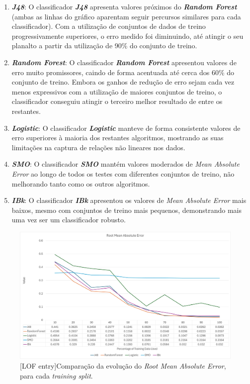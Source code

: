 \documentclass{easychair}
\begin{document}
\begin{enumerate}
	\item \textbf{\textit{J48}}: O classificador \textit{\textbf{J48}} apresenta valores próximos do \textbf{\textit{Random Forest}} (ambas as linhas do gráfico aparentam seguir percursos similares para cada classificador). Com a utilização de conjuntos de dados de treino progressivamente superiores, o erro medido foi diminuindo, até atingir o seu planalto a partir da utilização de 90\% do conjunto de treino.
	\item \textbf{\textit{Random Forest}}: O classificador \textit{\textbf{Random Forest}} apresentou valores de erro muito promissores, caindo de forma acentuada até cerca dos 60\% do conjunto de treino. Embora os ganhos de redução de erro sejam cada vez menos expressivos com a utilização de maiores conjuntos de treino, o classificador conseguiu atingir o terceiro melhor resultado de entre os restantes.
	\item \textbf{\textit{Logistic}}: O classificador \textit{\textbf{Logistic}} manteve de forma consistente valores de erro superiores à maioria dos restantes algoritmos, mostrando as suas limitações na captura de relações não lineares nos dados.
	\item \textbf{\textit{SMO}}: O classificador \textbf{\textit{SMO}} mantém valores moderados de \textit{Mean Absolute Error} ao longo de todos os testes com diferentes conjuntos de treino, não melhorando tanto como os outros algoritmos.
	\item \textbf{\textit{IBk}}: O classificador \textit{\textbf{IBk}} apresentou os valores de \textit{Mean Absolute Error} mais baixos, mesmo com conjuntos de treino mais pequenos, demonstrando mais uma vez ser um classificador robusto.
\end{enumerate}


\begin{figure}[H]
    \begin{centering}
    \includegraphics[width=1\linewidth]{imagens/figure35.jpg}\label{cap-5-fig35}
    [LOF entry]{Comparação da evolução do \textit{Root Mean Absolute Error}, para cada \textit{training split}.}
    \label{fig35}
    \end{centering}
\end{figure}
\end{document}
